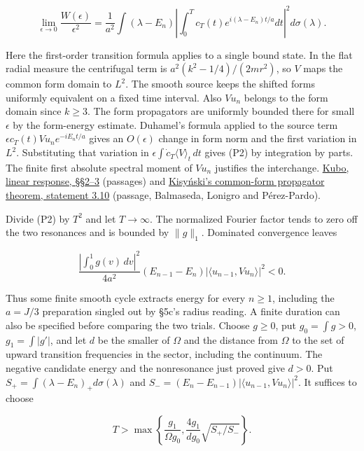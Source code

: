 \documentclass[11pt,a4paper]{article}
\begin{document}
\[
 \lim_{\epsilon\to0}\frac{W(\epsilon)}{\epsilon^2}
 =\frac1{a^2}\int(\lambda-E_n)
  \left|\int_0^T c_T(t)e^{i(\lambda-E_n)t/a}dt\right|^2
  d\sigma(\lambda).                                                \tag{P2}
\]

Here the first-order transition formula applies to a single bound state.
In the flat radial measure the centrifugal term is
\(a^2(k^2-1/4)/(2mr^2)\), so \(V\) maps the common form domain to
\(L^2\). The smooth source keeps the shifted forms uniformly equivalent
on a fixed time interval. Also \(Vu_n\) belongs to the form domain since
\(k\ge3\). The form propagators are uniformly bounded there for small
\(\epsilon\) by the form-energy estimate. Duhamel's formula applied to
the source term \(\epsilon c_T(t)Vu_n e^{-iE_nt/a}\) gives an
\(O(\epsilon)\) change in form norm and the first variation in \(L^2\).
Substituting that variation in
\(\epsilon\int\dot c_T\langle V\rangle_t\,dt\) gives (P2) by integration
by parts. The finite first absolute spectral moment of \(Vu_n\)
justifies the interchange.
\href{https://doi.org/10.1143/JPSJ.12.570}{Kubo, linear response,
§§2--3} (passages) and
\href{https://arxiv.org/pdf/2112.11063}{Kisyński's common-form
propagator theorem, statement 3.10} (passage, Balmaseda, Lonigro and
Pérez-Pardo).

Divide (P2) by \(T^2\) and let \(T\to\infty\). The normalized Fourier
factor tends to zero off the two resonances and is bounded by
\(\|g\|_1\). Dominated convergence leaves

\[
 \frac{|\int_0^1 g(v)\,dv|^2}{4a^2}
 (E_{n-1}-E_n)|\langle u_{n-1},Vu_n\rangle|^2<0 .
\]

Thus some finite smooth cycle extracts energy for every \(n\ge1\),
including the \(a=J/3\) preparation singled out by §5c's radius reading.
A finite duration can also be specified before comparing the two trials.
Choose \(g\ge0\), put \(g_0=\int g>0\), \(g_1=\int|g'|\), and let \(d\)
be the smaller of \(\Omega\) and the distance from \(\Omega\) to the set
of upward transition frequencies in the sector, including the continuum.
The negative candidate energy and the nonresonance just proved give
\(d>0\). Put \(S_+=\int(\lambda-E_n)_+d\sigma(\lambda)\) and
\(S_-=(E_n-E_{n-1})|\langle u_{n-1},Vu_n\rangle|^2\). It suffices to
choose

\[
 T>\max\left\{\frac{g_1}{\Omega g_0},
              \frac{4g_1}{d g_0}\sqrt{S_+/S_-}\right\}.
\]
\end{document}
